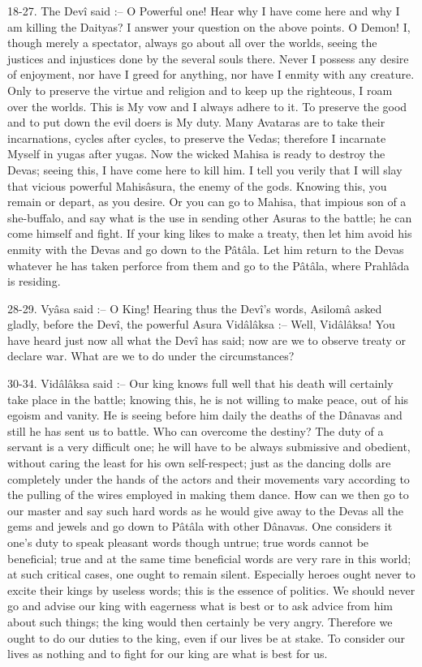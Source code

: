 18-27. The Dev\^i said :-- O Powerful one! Hear why I have come here and why I am killing the Daityas? I answer your question on the above points. O Demon! I, though merely a spectator, always go about all over the worlds, seeing the justices and injustices done by the several souls there. Never I possess any desire of enjoyment, nor have I greed for anything, nor have I enmity with any creature. Only to preserve the virtue and religion and to keep up the righteous, I roam over the worlds. This is My vow and I always adhere to it. To preserve the good and to put down the evil doers is My duty. Many Avataras are to take their incarnations, cycles after cycles, to preserve the Vedas; therefore I incarnate Myself in yugas after yugas. Now the wicked Mahisa is ready to destroy the Devas; seeing this, I have come here to kill him. I tell you verily that I will slay that vicious powerful Mahis\^asura, the enemy of the gods. Knowing this, you remain or depart, as you desire. Or you can go to Mahisa, that impious son of a she-buffalo, and say what is the use in sending other Asuras to the battle; he can come himself and fight. If your king likes to make a treaty, then let him avoid his enmity with the Devas and go down to the P\^at\^ala. Let him return to the Devas whatever he has taken perforce from them and go to the P\^at\^ala, where Prahl\^ada is residing.

28-29. Vy\^asa said :-- O King! Hearing thus the Dev\^i's words, Asilom\^a asked gladly, before the Dev\^i, the powerful Asura Vid\^al\^aksa :-- Well, Vid\^al\^aksa! You have heard just now all what the Dev\^i has said; now are we to observe treaty or declare war. What are we to do under the circumstances?

30-34. Vid\^al\^aksa said :-- Our king knows full well that his death will certainly take place in the battle; knowing this, he is not willing to make peace, out of his egoism and vanity. He is seeing before him daily the deaths of the D\^anavas and still he has sent us to battle. Who can overcome the destiny? The duty of a servant is a very difficult one; he will have to be always submissive and obedient, without caring the least for his own self-respect; just as the dancing dolls are completely under the hands of the actors and their movements vary according to the pulling of the wires employed in making them dance. How can we then go to our master and say such hard words as he would give away to the Devas all the gems and jewels and go down to P\^at\^ala with other D\^anavas. One considers it one's duty to speak pleasant words though untrue; true words cannot be beneficial; true and at the same time beneficial words are very rare in this world; at such critical cases, one ought to remain silent. Especially heroes ought never to excite their kings by useless words; this is the essence of politics. We should never go and advise our king with eagerness what is best or to ask advice from him about such things; the king would then certainly be very angry. Therefore we ought to do our duties to the king, even if our lives be at stake. To consider our lives as nothing and to fight for our king are what is best for us.


